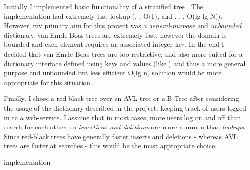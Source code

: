Initially I implemented basic functionality of a stratified tree \parencite{stratified}. The implementation had extremely fast lookup (, ,  O(1), and , , ,  O(lg lg N)). However, my primary aim for this project was a \textit{general-purpose} and \textit{unbounded} dictionary. van Emde Boas trees are extremely fast, however the domain is bounded and each element requires an associated integer key. In the end I decided that van Emde Boas trees are too restrictive, and also more suited for a dictionary interface defined using keys and values (like ) and thus a more general purpose and unbounded but less efficient O(lg n) solution would be more appropriate for this situation.

Finally, I chose a red-black tree over an AVL tree or a B-Tree after considering the usage of the dictionary described in the project: keeping track of users logged in to a web-service. I assume that in most cases, more users log on and off than search for each other, so \textit{insertions and deletions} are more common than \textit{lookups}. Since red-black trees have generally faster inserts and deletions \parencite{clrs} - whereas AVL trees are faster at searches - this would be the most appropriate choice.

 implementation \parencite{stackoverflow}